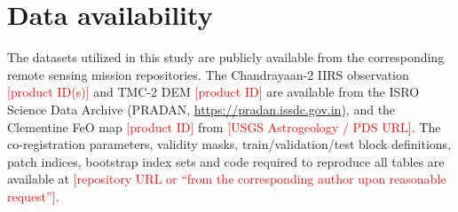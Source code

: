 \documentclass[pdflatex,sn-mathphys-num]{sn-jnl}
\newcommand{\fillin}[1]{\textcolor{red}{[#1]}}
\begin{document}




\section*{Data availability}

The datasets utilized in this study are publicly available from the corresponding remote sensing mission repositories. The Chandrayaan-2 IIRS observation \fillin{product ID(s)} and TMC-2 DEM \fillin{product ID} are available from the ISRO Science Data Archive (PRADAN, \url{https://pradan.issdc.gov.in}), and the Clementine FeO map \fillin{product ID} from \fillin{USGS Astrogeology / PDS URL}. The co-registration parameters, validity masks, train/validation/test block definitions, patch indices, bootstrap index sets and code required to reproduce all tables are available at \fillin{repository URL or ``from the corresponding author upon reasonable request''}.


\end{document}
